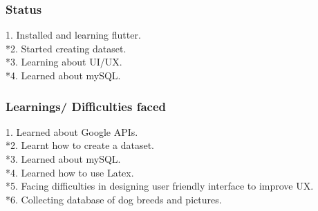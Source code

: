 \documentclass[14pt]{beamer}
\begin{document}
\begin{frame}
    \frametitle{Status}
    1. Installed and learning flutter.
    \\*2. Started creating dataset.
    \\*3. Learning about UI/UX.
    \\*4. Learned about mySQL.

\end{frame}


\begin{frame}
    \frametitle{Learnings/ Difficulties faced }
    1. Learned about Google APIs.
    \\*2. Learnt how to create a dataset.
    \\*3. Learned about mySQL. 
    \\*4. Learned how to use Latex. 
    \\*5. Facing difficulties in designing user friendly interface to improve UX. 
    \\*6. Collecting database of dog breeds and pictures.
\end{frame}
\end{document}
